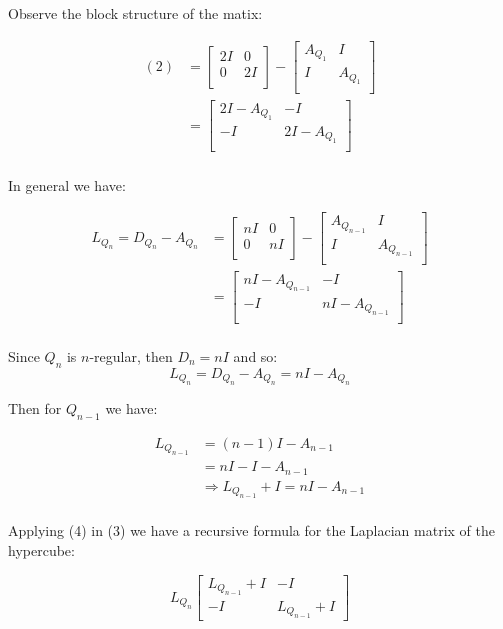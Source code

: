 \documentclass{article}
\begin{document}
\noindent Observe the block structure of the matix:

\begin{align}
\nonumber (2) & = \begin{bmatrix}
    2I & 0\\
    0 & 2I\\
\end{bmatrix} -
\begin{bmatrix}
    A_{Q_1} & I\\
    I & A_{Q_1}\\
\end{bmatrix}\\\nonumber  & = 
\begin{bmatrix}
    2I - A_{Q_1} & -I\\
    -I & 2I - A_{Q_1}\\
\end{bmatrix}
\\ \nonumber 
\end{align}

\noindent In general we have:

\begin{align}
\nonumber L_{Q_n} = D_{Q_n} - A_{Q_n} & = \begin{bmatrix}
    nI & 0\\
    0 &  nI\\
\end{bmatrix} -
\begin{bmatrix}
    A_{Q_{n-1}} & I\\
    I & A_{Q_{n-1}}\\
\end{bmatrix}\\  & = 
\begin{bmatrix}
    nI - A_{Q_{n-1}} & -I\\
    -I & nI - A_{Q_{n-1}}\\
\end{bmatrix}
\\ \nonumber 
\end{align}

\noindent Since $Q_n$ is $n$-regular, then $D_n = n I$ and so:
$$
L_{Q_n} = D_{Q_n} - A_{Q_n} = nI - A_{Q_n} 
$$

\noindent Then for $Q_{n-1}$ we have:

\begin{align}
\nonumber L_{Q_{n-1}} & = (n-1) I - A_{n-1}\\\nonumber & = n I - I - A_{n-1} \\ & \Rightarrow L_{Q_{n-1}} + I = n I - A_{n-1}
\\ \nonumber 
\end{align}

\noindent Applying (4) in (3) we have a recursive formula for the Laplacian matrix of the hypercube:

$$ L_{Q_n}
\begin{bmatrix}
    L_{Q_{n-1}} + I & - I \\
    - I & L_{Q_{n-1}} + I
\end{bmatrix}
$$

\end{document}
